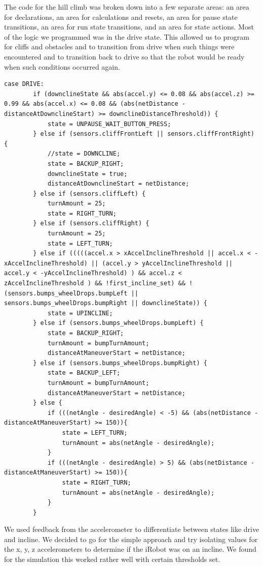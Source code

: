 \documentclass[twoside]{article}
\begin{document}
\noindent The code for the hill climb was broken down into a few separate areas: an area for declarations, an area for calculations and resets, an area for pause state transitions, an area for run state transitions, and an area for state actions. Most of the logic we programmed was in the drive state. This allowed us to program for cliffs and obstacles and to transition from drive when such things were encountered and to transition back to drive so that the robot would be ready when such conditions occurred again.\\

\vspace{5mm}
\begin{lstlisting}[mathescape, frame=single]
case DRIVE:
		if (downclineState && abs(accel.y) <= 0.08 && abs(accel.z) >= 0.99 && abs(accel.x) <= 0.08 && (abs(netDistance - distanceAtDownclineStart) >= downclineDistanceThreshold)) {
			state = UNPAUSE_WAIT_BUTTON_PRESS;
		} else if (sensors.cliffFrontLeft || sensors.cliffFrontRight) {
			//state = DOWNCLINE;
			state = BACKUP_RIGHT;
			downclineState = true;
			distanceAtDownclineStart = netDistance;
		} else if (sensors.cliffLeft) {
			turnAmount = 25;
			state = RIGHT_TURN;
		} else if (sensors.cliffRight) {
			turnAmount = 25;
			state = LEFT_TURN;
		} else if (((((accel.x > xAccelInclineThreshold || accel.x < -xAccelInclineThreshold) || (accel.y > yAccelInclineThreshold || accel.y < -yAccelInclineThreshold) ) && accel.z < zAccelInclineThreshold ) && !first_incline_set) && !(sensors.bumps_wheelDrops.bumpLeft || sensors.bumps_wheelDrops.bumpRight || downclineState)) {
			state = UPINCLINE;
		} else if (sensors.bumps_wheelDrops.bumpLeft) {
            state = BACKUP_RIGHT;
			turnAmount = bumpTurnAmount;
            distanceAtManeuverStart = netDistance;
        } else if (sensors.bumps_wheelDrops.bumpRight) {
            state = BACKUP_LEFT;
			turnAmount = bumpTurnAmount;
            distanceAtManeuverStart = netDistance;
        } else {
            if (((netAngle - desiredAngle) < -5) && (abs(netDistance - distanceAtManeuverStart) >= 150)){
                state = LEFT_TURN;
				turnAmount = abs(netAngle - desiredAngle);
            }
            if (((netAngle - desiredAngle) > 5) && (abs(netDistance - distanceAtManeuverStart) >= 150)){
                state = RIGHT_TURN;
				turnAmount = abs(netAngle - desiredAngle);
            }
        }
\end{lstlisting}

\noindent We used feedback from the accelerometer to differentiate between states like drive and incline. We decided to go for the simple approach and try isolating values for the x, y, z accelerometers to determine if the iRobot was on an incline. We found for the simulation this worked rather well with certain thresholds set. 
\end{document}
